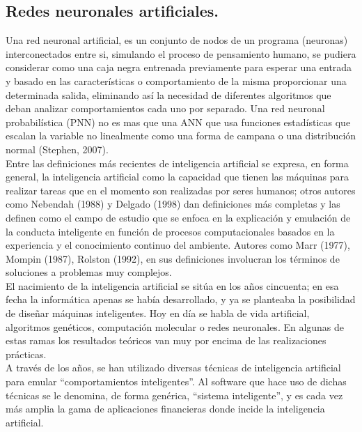 \subsection{Redes neuronales artificiales.}

Una red neuronal artificial,  es un conjunto de nodos de un programa (neuronas) interconectados entre si, simulando el proceso de pensamiento humano, se pudiera considerar como una caja negra entrenada previamente para esperar una entrada y basado en las características o comportamiento de la misma proporcionar una determinada salida, eliminando así la necesidad de diferentes algoritmos que deban analizar comportamientos cada uno por separado. Una red neuronal probabilística (PNN) no es mas que una ANN que usa funciones estadísticas que escalan la variable no linealmente como una forma de campana o una distribución normal (Stephen, 2007).\\

Entre las definiciones más recientes de inteligencia artificial se expresa, en forma general, la inteligencia artificial como la capacidad que tienen las máquinas para realizar tareas que en el momento son realizadas por seres humanos; otros autores como Nebendah (1988) y Delgado (1998) dan definiciones más completas y las definen como el campo de estudio que se enfoca en la explicación y emulación de la conducta inteligente en función de procesos computacionales basados en la experiencia y el conocimiento continuo del ambiente. Autores como Marr (1977), Mompin (1987), Rolston (1992), en sus definiciones involucran los términos de soluciones a problemas muy complejos.\\

El nacimiento de la inteligencia artificial se sitúa en los años cincuenta; en esa fecha la informática apenas se había desarrollado, y ya se planteaba la posibilidad de diseñar máquinas inteligentes. Hoy en día se habla de vida artificial, algoritmos genéticos, computación molecular o redes neuronales. En algunas de estas ramas los resultados teóricos van muy por encima de las realizaciones prácticas.\\

A través de los años, se han utilizado diversas técnicas de inteligencia artificial para emular ``comportamientos inteligentes''. Al software que hace uso de dichas técnicas se le denomina, de forma genérica, ``sistema inteligente'', y es cada vez más amplia la gama de aplicaciones financieras donde incide la inteligencia artificial.\\

